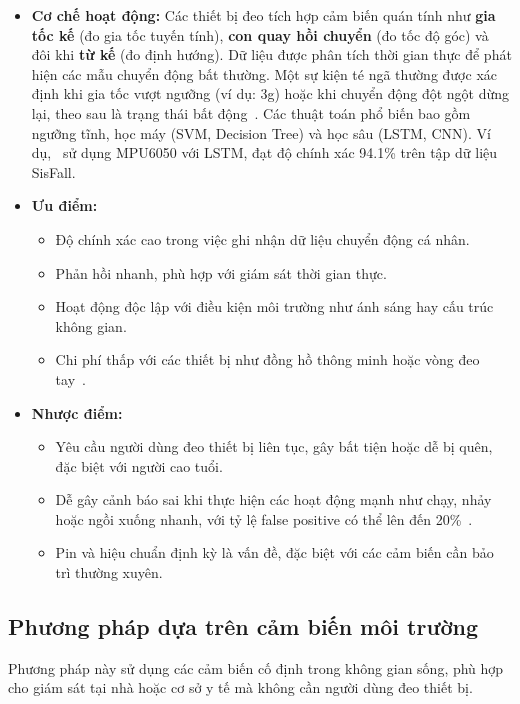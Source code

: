 \begin{itemize}
    \item \textbf{Cơ chế hoạt động:} Các thiết bị đeo tích hợp cảm biến quán tính như \textbf{gia tốc kế} (đo gia tốc tuyến tính), \textbf{con quay hồi chuyển} (đo tốc độ góc) và đôi khi \textbf{từ kế} (đo định hướng). Dữ liệu được phân tích thời gian thực để phát hiện các mẫu chuyển động bất thường. Một sự kiện té ngã thường được xác định khi gia tốc vượt ngưỡng (ví dụ: 3g) hoặc khi chuyển động đột ngột dừng lại, theo sau là trạng thái bất động~\cite{xu2023}. Các thuật toán phổ biến bao gồm ngưỡng tĩnh, học máy (SVM, Decision Tree) và học sâu (LSTM, CNN). Ví dụ,~\cite{hussain2019} sử dụng MPU6050 với LSTM, đạt độ chính xác 94.1\% trên tập dữ liệu SisFall.
    \item \textbf{Ưu điểm:} 
    \begin{itemize}
        \item Độ chính xác cao trong việc ghi nhận dữ liệu chuyển động cá nhân.
        \item Phản hồi nhanh, phù hợp với giám sát thời gian thực.
        \item Hoạt động độc lập với điều kiện môi trường như ánh sáng hay cấu trúc không gian.
        \item Chi phí thấp với các thiết bị như đồng hồ thông minh hoặc vòng đeo tay~\cite{wearable20152024}.
    \end{itemize}
    \item \textbf{Nhược điểm:}
    \begin{itemize}
        \item Yêu cầu người dùng đeo thiết bị liên tục, gây bất tiện hoặc dễ bị quên, đặc biệt với người cao tuổi.
        \item Dễ gây cảnh báo sai khi thực hiện các hoạt động mạnh như chạy, nhảy hoặc ngồi xuống nhanh, với tỷ lệ false positive có thể lên đến 20\%~\cite{alarifi2021}.
        \item Pin và hiệu chuẩn định kỳ là vấn đề, đặc biệt với các cảm biến cần bảo trì thường xuyên.
    \end{itemize}
\end{itemize}

\subsection{Phương pháp dựa trên cảm biến môi trường}

Phương pháp này sử dụng các cảm biến cố định trong không gian sống, phù hợp cho giám sát tại nhà hoặc cơ sở y tế mà không cần người dùng đeo thiết bị.

